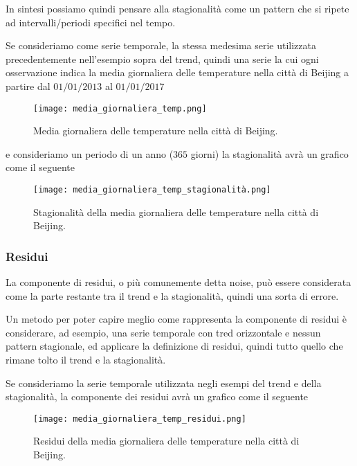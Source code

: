 In sintesi possiamo quindi pensare alla stagionalità come un pattern che si ripete ad 
intervalli/periodi specifici nel tempo.


\begin{esempio} 

    Se consideriamo come serie temporale, la stessa medesima serie utilizzata 
    precedentemente nell'esempio sopra del trend, quindi una serie la cui 
    ogni osservazione indica la media giornaliera delle temperature 
    nella città di Beijing a partire dal $01/01/2013$ al $01/01/2017$

    \begin{figure}[H]
        \centering
        \texttt{[image: media\_giornaliera\_temp.png]}
        \caption{Media giornaliera delle temperature nella città di Beijing.}
    \end{figure}

    e consideriamo un periodo di un anno ($365$ giorni) la stagionalità avrà un grafico
    come il seguente

    \begin{figure}[H]
        \centering
        \texttt{[image: media\_giornaliera\_temp\_stagionalità.png]}
        \caption{Stagionalità della media giornaliera delle temperature nella città di Beijing.}
    \end{figure}

\end{esempio}


\subsubsection{Residui}
La componente di residui, o più comunemente detta noise, può essere considerata come
la parte restante tra il trend e la stagionalità, quindi una sorta di errore.

Un metodo per poter capire meglio come rappresenta la componente di residui 
è considerare, ad esempio, una serie temporale con tred orizzontale e nessun pattern
stagionale, ed applicare la definizione di residui, quindi tutto quello che rimane
tolto il trend e la stagionalità.

\begin{esempio} 

    Se consideriamo la serie temporale utilizzata negli esempi del trend
    e della stagionalità, la componente dei residui avrà un grafico come il seguente

    \begin{figure}[H]
        \centering
        \texttt{[image: media\_giornaliera\_temp\_residui.png]}
        \caption{Residui della media giornaliera delle temperature nella città di Beijing.}
    \end{figure}

\end{esempio}



